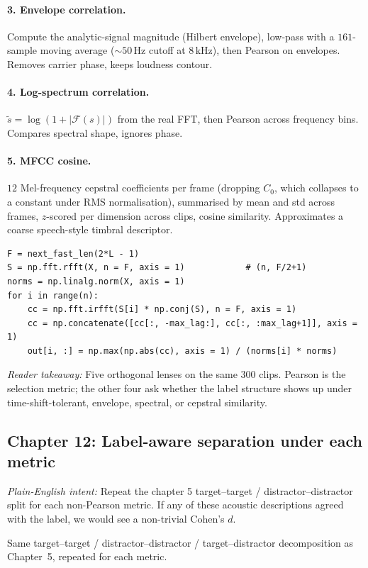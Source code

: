 \documentclass[11pt]{article}
\newcommand{\pintent}[1]{\par\medskip\noindent\textit{Plain-English intent:} #1\par\smallskip}
\newcommand{\pkey}[1]{\par\medskip\noindent\textit{Reader takeaway:} #1\par\smallskip}
\begin{document}
\paragraph{3. Envelope correlation.}
Compute the analytic-signal magnitude (Hilbert envelope), low-pass with
a $161$-sample moving average ($\sim 50\,\mathrm{Hz}$ cutoff at $8\,\mathrm{kHz}$),
then Pearson on envelopes.  Removes carrier phase, keeps loudness
contour.

\paragraph{4. Log-spectrum correlation.}
$\tilde s = \log(1 + |\mathcal F(s)|)$ from the real FFT, then Pearson
across frequency bins.  Compares spectral shape, ignores phase.

\paragraph{5. MFCC cosine.}
$12$ Mel-frequency cepstral coefficients per frame (dropping $C_0$,
which collapses to a constant under RMS normalisation), summarised by
mean and std across frames, $z$-scored per dimension across clips,
cosine similarity.  Approximates a coarse speech-style timbral
descriptor.

\begin{lstlisting}[caption={Lagged cross-correlation core.}]
F = next_fast_len(2*L - 1)
S = np.fft.rfft(X, n = F, axis = 1)            # (n, F/2+1)
norms = np.linalg.norm(X, axis = 1)
for i in range(n):
    cc = np.fft.irfft(S[i] * np.conj(S), n = F, axis = 1)
    cc = np.concatenate([cc[:, -max_lag:], cc[:, :max_lag+1]], axis = 1)
    out[i, :] = np.max(np.abs(cc), axis = 1) / (norms[i] * norms)
\end{lstlisting}
\pkey{Five orthogonal lenses on the same $300$ clips. Pearson is the
selection metric; the other four ask whether the label structure shows up
under time-shift-tolerant, envelope, spectral, or cepstral similarity.}

\subsection{Chapter 12: Label-aware separation under each metric}
\pintent{Repeat the chapter 5 target--target / distractor--distractor split
for each non-Pearson metric. If any of these acoustic descriptions agreed
with the label, we would see a non-trivial Cohen's $d$.}

Same target--target / distractor--distractor / target--distractor
decomposition as Chapter~5, repeated for each metric.
\end{document}
